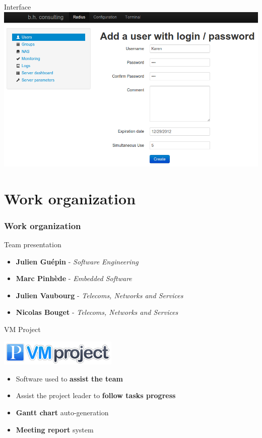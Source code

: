 \documentclass[12pt]{beamer}
\begin{document}
\begin{frame}{Interface}
    \includegraphics[width=\textwidth]{img/capture4.png}
\end{frame}

\part{Work organization}
\frame{\partpage}
\section{Work organization}

\begin{frame}{Team presentation}
    \begin{itemize}[<+->]
	\item {\bf Julien Guépin} - \emph{Software Engineering}
	\vfill
	\item {\bf Marc Pinhède} - \emph{Embedded Software}
	\vfill
	\item {\bf Julien Vaubourg} - \emph{Telecoms, Networks and Services}
	\vfill
	\item {\bf Nicolas Bouget} - \emph{Telecoms, Networks and Services}
    \end{itemize}
\end{frame}

\begin{frame}{VM Project}
    \begin{center}
    \includegraphics[width=160pt]{img/vmproject_logo.png}
    \end{center}
    \begin{itemize}[<+->]
	\item Software used to \textbf{assist the team}
    	\vfill
    	\item Assist the project leader to \textbf{follow tasks progress}
    	\vfill
    	\item \textbf{Gantt chart} auto-generation
    	\vfill
    	\item \textbf{Meeting report} system
    \end{itemize}
\end{frame}
\end{document}
